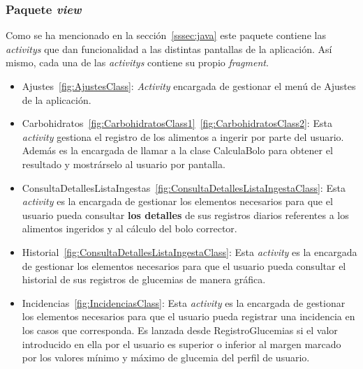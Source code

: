 \subsubsection{Paquete \textit{view}}
Como se ha mencionado en la sección~\ref{sssec:java} este paquete contiene las \textit{activitys} que dan funcionalidad a las distintas pantallas de la aplicación. Así mismo, cada una de las \textit{activitys} contiene su propio \textit{fragment}.
\begin{itemize}
	\item Ajustes~\ref{fig:AjustesClass}: \textit{Activity} encargada de gestionar el menú de Ajustes de la aplicación.
	\item Carbohidratos~\ref{fig:CarbohidratosClass1}~\ref{fig:CarbohidratosClass2}: Esta \textit{activity} gestiona el registro de los alimentos a ingerir por parte del usuario. Además es la encargada de llamar a la clase CalculaBolo para obtener el resultado y mostrárselo al usuario por pantalla.
	\item ConsultaDetallesListaIngestas~\ref{fig:ConsultaDetallesListaIngestaClass}: Esta \textit{activity} es la encargada de gestionar los elementos necesarios para que el usuario pueda consultar \textbf{los detalles} de sus registros diarios referentes a los alimentos ingeridos y al cálculo del bolo corrector. 
	\item Historial~\ref{fig:ConsultaDetallesListaIngestaClass}: Esta \textit{activity} es la encargada de gestionar los elementos necesarios para que el usuario pueda consultar el historial de sus registros de glucemias de manera gráfica.
	\item Incidencias~\ref{fig:IncidenciasClass}: Esta \textit{activity} es la encargada de gestionar los elementos necesarios para que el usuario pueda registrar una incidencia en los casos que corresponda. Es lanzada desde
RegistroGlucemias si el valor introducido en ella por el usuario es superior o inferior al margen marcado por los valores mínimo y máximo de glucemia del perfil de usuario.

\end{itemize}
